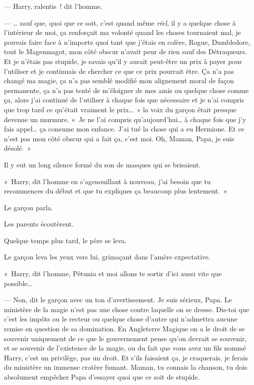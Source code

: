 --- Harry, ralentis~! dit l'homme.

--- … sauf que, quoi que ce soit, c'est quand même \emph{réel}, il y a quelque chose à l'intérieur de moi, ça renforçait ma volonté quand les choses tournaient mal, je pouvais faire face à n'importe quoi tant que j'étais en colère, Rogue, Dumbledore, tout le Magenmagot, mon côté obscur n'avait peur de rien sauf des Détraqueurs.
Et je n'étais pas stupide, je savais qu'il y aurait peut-être un prix à payer pour l'utiliser et je continuais de chercher ce que ce prix pourrait être.
Ça n'a pas changé ma magie, ça n'a pas semblé modifié mon alignement moral de façon permanente, ça n'a pas tenté de m'éloigner de mes amis ou quelque chose comme ça, alors j'ai continué de l'utiliser à chaque fois que nécessaire et je n'ai compris que trop tard ce qu'était vraiment le prix…~»
la voix du garçon était presque devenue un murmure.
«~Je ne l'ai compris qu'aujourd'hui… à chaque fois que j'y fais appel… ça consume mon enfance.
J'ai tué la chose qui a eu Hermione.
Et ce n'est pas mon côté obscur qui a fait ça, c'est moi.
Oh, Maman, Papa, je suis désolé.~»

Il y eut un long silence formé du son de masques qui se brisaient.

«~Harry, dit l'homme en s'agenouillant à nouveau, j'ai besoin que tu recommences du début et que tu expliques ça beaucoup plus lentement.~»

Le garçon parla.

Les parents écoutèrent.

Quelque temps plus tard, le père se leva.

Le garçon leva les yeux vers lui, grimaçant dans l'amère expectative.

«~Harry, dit l'homme, Pétunia et moi allons te sortir d'ici aussi vite que possible…

--- Non, dit le garçon avec un ton d'avertissement.
Je suis sérieux, Papa.
Le ministère de la magie n'est pas une chose contre laquelle on se dresse.
Dis-toi que c'est les impôts ou le recteur ou quelque chose d'autre qui n'admettra aucune remise en question de sa domination.
En Angleterre Magique on a le droit de se souvenir uniquement de ce que le gouvernement pense qu'on devrait se souvenir, et se souvenir de l'existence de la magie, ou du fait que vous avez un fils nommé Harry, c'est un privilège, pas un droit.
Et s'ils faisaient ça, je craquerais, je ferais du ministère un immense cratère fumant.
Maman, tu connais la chanson, tu dois absolument empêcher Papa d'essayer quoi que ce soit de stupide.

